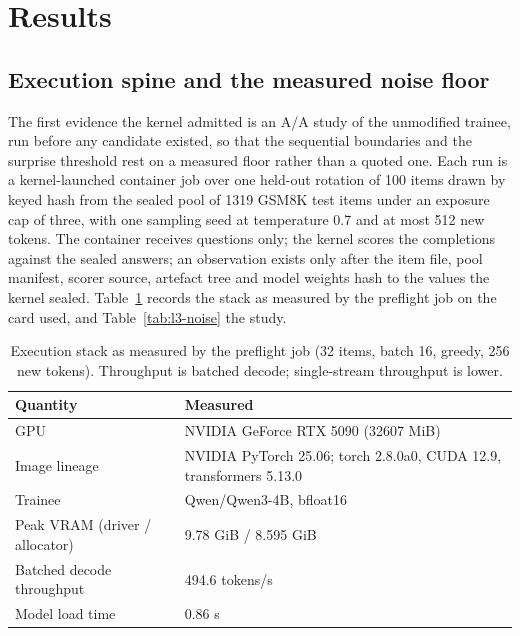 \section{Results}
\label{sec:results}

\subsection{Execution spine and the measured noise floor}
\label{sec:results-l3}

The first evidence the kernel admitted is an A/A study of the unmodified trainee, run before any candidate existed, so that the sequential boundaries and the surprise threshold rest on a measured floor rather than a quoted one. Each run is a kernel-launched container job over one held-out rotation of 100 items drawn by keyed hash from the sealed pool of 1319 GSM8K test items under an exposure cap of three, with one sampling seed at temperature 0.7 and at most 512 new tokens. The container receives questions only; the kernel scores the completions against the sealed answers; an observation exists only after the item file, pool manifest, scorer source, artefact tree and model weights hash to the values the kernel sealed. Table~\ref{tab:l3-stack} records the stack as measured by the preflight job on the card used, and Table~\ref{tab:l3-noise} the study.

\begin{table}[t]
\centering
\caption{Execution stack as measured by the preflight job (32 items, batch 16, greedy, 256 new tokens). Throughput is batched decode; single-stream throughput is lower.}
\label{tab:l3-stack}
\begin{tabular}{ll}
\toprule
\textbf{Quantity} & \textbf{Measured} \\
\midrule
GPU & NVIDIA GeForce RTX 5090 (32607 MiB) \\
Image lineage & NVIDIA PyTorch 25.06; torch 2.8.0a0, CUDA 12.9, transformers 5.13.0 \\
Trainee & Qwen/Qwen3-4B, bfloat16 \\
Peak VRAM (driver / allocator) & 9.78 GiB / 8.595 GiB \\
Batched decode throughput & 494.6 tokens/s \\
Model load time & 0.86 s \\
\bottomrule
\end{tabular}
\end{table}

